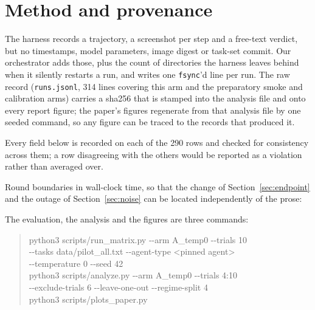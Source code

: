 \section{Method and provenance}
\label{app:provenance}
The harness records a trajectory, a screenshot per step and a free-text
verdict, but no timestamps, model parameters, image digest or task-set commit.
Our orchestrator adds those, plus the count of directories the harness leaves
behind when it silently restarts a run, and writes one \texttt{fsync}'d line
per run. The raw record (\texttt{runs.jsonl}, 314 lines covering this arm and
the preparatory smoke and calibration arms) carries a sha256 that is stamped
into the analysis file and onto every report figure; the paper's figures
regenerate from that analysis file by one seeded command, so any figure can be
traced to the records that produced it.

Every field below is recorded on each of the 290 rows and checked for
consistency across them; a row disagreeing with the others would be reported as
a violation rather than averaged over.

\begin{center}\small

\end{center}

\noindent Round boundaries in wall-clock time, so that the change of
Section~\ref{sec:endpoint} and the outage of Section~\ref{sec:noise} can
be located independently of the prose:

\begin{center}\small

\end{center}

\noindent The evaluation, the analysis and the figures are three commands:

\begin{quote}\ttfamily\small
python3 scripts/run\_matrix.py -{}-arm A\_temp0 -{}-trials 10 \\
\hspace*{2em}-{}-tasks data/pilot\_all.txt -{}-agent-type <pinned agent> \\
\hspace*{2em}-{}-temperature 0 -{}-seed 42 \\[2pt]
python3 scripts/analyze.py -{}-arm A\_temp0 -{}-trials 4:10 \\
\hspace*{2em}-{}-exclude-trials 6 -{}-leave-one-out -{}-regime-split 4 \\[2pt]
python3 scripts/plots\_paper.py
\end{quote}

